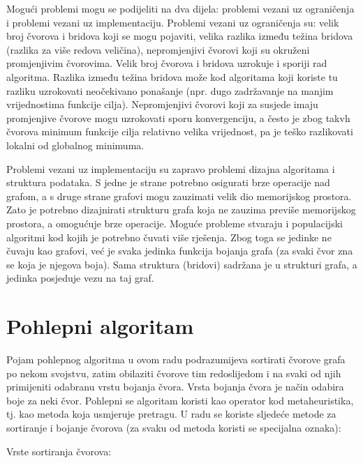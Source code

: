 \documentclass[times, utf8, diplomski, numeric]{fer}
\begin{document}
Mogući problemi mogu se podijeliti na dva dijela: problemi vezani uz ograničenja i problemi vezani uz implementaciju. Problemi vezani uz ograničenja su: velik broj čvorova i bridova koji se mogu pojaviti, velika razlika između težina bridova (razlika za više redova veličina), nepromjenjivi čvorovi koji su okruženi promjenjivim čvorovima. Velik broj čvorova i bridova uzrokuje i sporiji rad algoritma. Razlika između težina bridova može kod algoritama koji koriste tu razliku uzrokovati neočekivano ponašanje (npr. dugo zadržavanje na manjim vrijednostima funkcije cilja). Nepromjenjivi čvorovi koji za susjede imaju promjenjive čvorove mogu uzrokovati sporu konvergenciju, a često je zbog takvh čvorova minimum funkcije cilja relativno velika vrijednost, pa je teško razlikovati lokalni od globalnog minimuma. 

Problemi vezani uz implementaciju su zapravo problemi dizajna algoritama i struktura podataka. S jedne je strane potrebno osigurati brze operacije nad grafom, a s druge strane grafovi mogu zauzimati velik dio memorijskog prostora. Zato je potrebno dizajnirati strukturu grafa koja ne zauzima previše memorijskog prostora, a omogućuje brze operacije. Moguće probleme stvaraju i populacijski algoritmi kod kojih je potrebno čuvati više rješenja. Zbog toga se jedinke ne čuvaju kao grafovi, već je svaka jedinka funkcija bojanja grafa (za svaki čvor zna se koja je njegova boja). Sama struktura (bridovi) sadržana je u strukturi grafa, a jedinka posjeduje vezu na taj graf.

\section{Pohlepni algoritam}

Pojam pohlepnog algoritma u ovom radu podrazumijeva sortirati čvorove grafa po nekom svojstvu, zatim obilaziti čvorove tim redoslijedom i na svaki od njih primijeniti odabranu vrstu bojanja čvora. Vrsta bojanja čvora je način odabira boje za neki čvor. Pohlepni se algoritam koristi kao operator kod metaheuristika, tj. kao metoda koja usmjeruje pretragu.
U radu se koriste sljedeće metode za sortiranje i bojanje čvorova (za svaku od metoda koristi se specijalna oznaka):

Vrste sortiranja čvorova:
\end{document}

